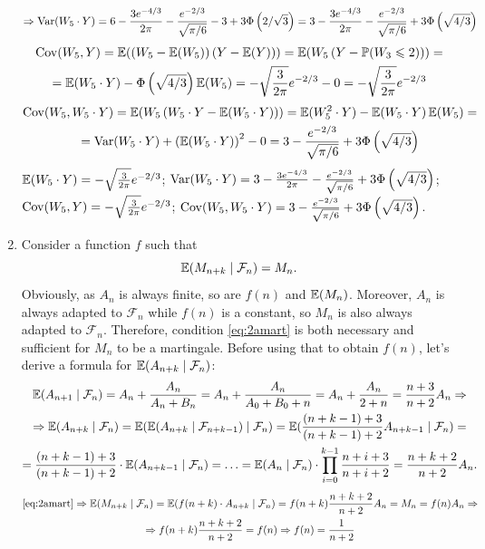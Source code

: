 \documentclass[12pt, a4paper]{article}
\newcommand{\cF}{\mathcal{F}}
\begin{document}
\begin{enumerate}
\begin{multline*}
\end{multline*}
\begin{multline*}
\Rightarrow \operatorname{Var}(W_5 \cdot Y) = 6 - \frac{3e^{-4/3}}{2\pi} - \frac{e^{-2/3}}{\sqrt{\pi/6}} - 3 + 3\Phi\left(2/\sqrt{3}\right) = 3 - \frac{3e^{-4/3}}{2\pi} - \frac{e^{-2/3}}{\sqrt{\pi/6}} + 3\Phi\left(\sqrt{4/3}\right)
\end{multline*}
\begin{multline*}
	\operatorname{Cov}(W_5,Y) = \operatorname{\mathbb{E}}(\left(W_5 - \operatorname{\mathbb{E}}(W_5)\right)\left(Y - \operatorname{\mathbb{E}}(Y)\right)) = \operatorname{\mathbb{E}}(W_5 \left(Y - \operatorname{\mathbb{P}}(W_3 \leqslant 2)\right)) =\\
	= \operatorname{\mathbb{E}}(W_5 \cdot Y) - \Phi\left(\sqrt{4/3}\right) \operatorname{\mathbb{E}}(W_5) = -\sqrt{\frac{3}{2\pi}} e^{-2/3} - 0 = -\sqrt{\frac{3}{2\pi}} e^{-2/3}
\end{multline*}
\begin{multline*}
	\operatorname{Cov}(W_5,W_5 \cdot Y) = \operatorname{\mathbb{E}}(W_5 \left(W_5 \cdot Y - \operatorname{\mathbb{E}}(W_5 \cdot Y)\right)) = \operatorname{\mathbb{E}}(W_5^2 \cdot Y) - \operatorname{\mathbb{E}}(W_5 \cdot Y) \operatorname{\mathbb{E}}(W_5) =\\
	= \operatorname{Var}(W_5 \cdot Y) + \left(\operatorname{\mathbb{E}}(W_5 \cdot Y)\right)^2 - 0 = 3 - \frac{e^{-2/3}}{\sqrt{\pi/6}} + 3\Phi\left(\sqrt{4/3}\right)
\end{multline*}
$\operatorname{\mathbb{E}}(W_5 \cdot Y) = -\sqrt{\frac{3}{2\pi}} e^{-2/3}$; $\operatorname{Var}(W_5 \cdot Y) = 3 - \frac{3e^{-4/3}}{2\pi} - \frac{e^{-2/3}}{\sqrt{\pi/6}} + 3\Phi\left(\sqrt{4/3}\right)$; $\operatorname{Cov}(W_5,Y) = -\sqrt{\frac{3}{2\pi}} e^{-2/3}$; $\operatorname{Cov}(W_5, W_5 \cdot Y) = 3 - \frac{e^{-2/3}}{\sqrt{\pi/6}} + 3\Phi\left(\sqrt{4/3}\right)$.


\item Consider a function $f$ such that
\begin{equation}\label{eq:2amart}
	\E(M_{n+k} \mid \cF_n) = M_n.
\end{equation}
Obviously, as $A_n$ is always finite, so are $f(n)$ and $\operatorname{\mathbb{E}}(M_n)$. Moreover, $A_n$ is always adapted to $\cF_n$ while $f(n)$ is a constant, so $M_n$ is also always adapted to $\cF_n$. Therefore, condition \eqref{eq:2amart} is both necessary and sufficient for $M_n$ to be a martingale. Before using that to obtain $f(n)$, let's derive a formula for $\E(A_{n+k} \mid \cF_n)$:
\begin{multline*}
	\E(A_{n+1} \mid \cF_n) = A_n + \frac{A_n}{A_n + B_n} = A_n + \frac{A_n}{A_0 + B_0 + n} = A_n + \frac{A_n}{2 + n} = \frac{n+3}{n+2} A_n \Rightarrow\\\Rightarrow \E(A_{n+k} \mid \cF_n) = \E(\E(A_{n+k} \mid \cF_{n+k-1}) \mid \cF_n) = \E(\frac{(n+k-1)+3}{(n+k-1)+2} A_{n+k-1} \mid \cF_n) =\\
	= \frac{(n+k-1)+3}{(n+k-1)+2} \cdot \E(A_{n+k-1} \mid \cF_n) = \ldots = \E(A_{n} \mid \cF_n) \cdot \prod_{i=0}^{k-1} \frac{n+i+3}{n+i+2} = \frac{n+k+2}{n+2} A_n.
\end{multline*}
\begin{multline*}
	\eqref{eq:2amart} \Rightarrow \E(M_{n+k} \mid \cF_n) = \E(f(n+k) \cdot A_{n+k} \mid \cF_n) = f(n+k) \frac{n+k+2}{n+2} A_n = M_n = f(n) A_n \Rightarrow\\\Rightarrow f(n+k) \frac{n+k+2}{n+2} = f(n) \Rightarrow f(n) = \dfrac{1}{n+2}
\end{multline*}


\end{enumerate}
\end{document}

